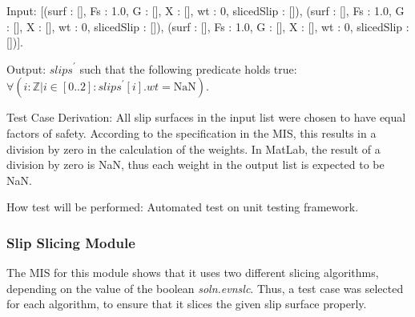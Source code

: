 \documentclass[12pt, titlepage]{article}
\begin{document}
\begin{enumerate}[label=TC\arabic*:,ref={\arabic*}]
	Input: [(surf : [], Fs : 1.0, G : [], X : [], wt : 0, slicedSlip : []), 
	(surf : [], Fs : 1.0, G : [], X : [], wt : 0, slicedSlip : []), 
	(surf : [], Fs : 1.0, G : [], X : [], wt : 0, slicedSlip : [])].
	
	Output: $\textit{slips}^\prime$ such that the following predicate holds 
	true:\\ 
	$\forall(i : \mathbb{Z} | i \in [0..2] : \textit{slips}^\prime[i].wt = 
	\text{NaN})$.
	
	Test Case Derivation: All slip surfaces in the input list were chosen to 
	have equal factors of safety. According to the specification in the MIS, 
	this results in a division by zero in the calculation of the weights. In 
	MatLab, the result of a division by zero is NaN, thus each weight in the 
	output list is expected to be NaN.
	
	How test will be performed: Automated test on unit testing framework.

\end{enumerate}

\subsubsection{Slip Slicing Module}
The MIS for this module shows that it uses two different slicing algorithms, 
depending on the value of the boolean \textit{soln.evnslc}. Thus, a test case 
was selected for each algorithm, to ensure that it slices the given slip 
surface properly.
\end{document}
